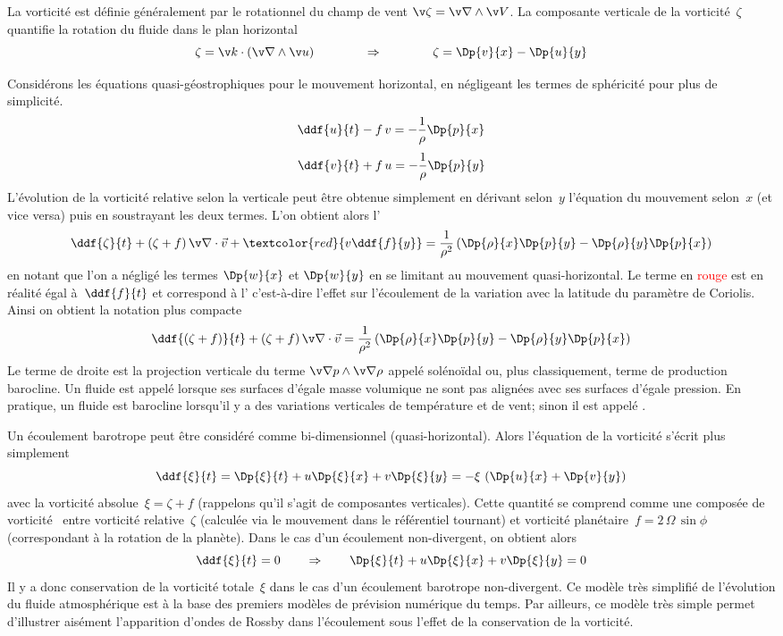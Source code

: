 \sk
La vorticité est définie généralement par le rotationnel du champ de vent
$\v \zeta = \v \nabla \wedge \v V$. La composante verticale de la vorticité~$\zeta$
quantifie la rotation du fluide dans le plan horizontal
\[ 
\zeta = \v k \cdot \left( \v \nabla \wedge \v u \right) 
\qquad\qquad \Rightarrow \qquad\qquad
\zeta = \Dp{v}{x} - \Dp{u}{y}
\]

\sk
Considérons les équations quasi-géostrophiques pour le mouvement horizontal,
en négligeant les termes de sphéricité pour plus de simplicité.
\[ \ddf{u}{t} - f\,v = -\frac{1}{\rho} \Dp{p}{x} \]
\[ \ddf{v}{t} + f\,u = -\frac{1}{\rho} \Dp{p}{y} \]
\noindent L'évolution 
de la vorticité relative 
selon la verticale
peut être obtenue simplement en
dérivant selon~$y$ l'équation du mouvement selon~$x$
(et vice versa) puis en soustrayant les deux termes.
L'on obtient alors l'
\[
\ddf{\zeta}{t} + (\zeta+f) \, \v \nabla \cdot \vec v + \textcolor{red}{v \ddf{f}{y}}
= \frac{1}{\rho^2} \left( \Dp{\rho}{x} \Dp{p}{y} - \Dp{\rho}{y} \Dp{p}{x} \right)
\]
\noindent en notant que l'on a négligé les termes
$\Dp{w}{x}$ et $\Dp{w}{y}$ en se limitant au mouvement quasi-horizontal.
Le terme en \textcolor{red}{rouge} est en réalité égal à~$\ddf{f}{t}$
et correspond à l' c'est-à-dire
l'effet sur l'écoulement de la variation avec la
latitude du paramètre de Coriolis.
Ainsi on obtient la notation plus compacte
\[
\ddf{(\zeta + f)}{t} + (\zeta+f) \, \v \nabla \cdot \vec v
= \frac{1}{\rho^2} \left( \Dp{\rho}{x} \Dp{p}{y} - \Dp{\rho}{y} \Dp{p}{x} \right)
\]
\noindent Le terme de droite est la projection verticale
du terme $\v \nabla p \wedge \v \nabla \rho$
appelé solénoïdal ou, plus classiquement, terme de production barocline.
Un fluide est appelé  lorsque
ses surfaces d'égale masse volumique
ne sont pas alignées avec ses surfaces d'égale pression.
En pratique, un fluide est barocline
lorsqu'il y a des variations verticales de température
et de vent; sinon il est appelé .


\sk
Un écoulement barotrope peut être considéré comme bi-dimensionnel (quasi-horizontal).
Alors l'équation de la vorticité s'écrit plus simplement
\[
\ddf{\xi}{t}
=
\Dp{\xi}{t} + u \Dp{\xi}{x} + v \Dp{\xi}{y}
=
- \xi \, \left( \Dp{u}{x} + \Dp{v}{y} \right)
\]
\noindent avec la vorticité absolue~$\xi = \zeta + f$
(rappelons qu'il s'agit de composantes verticales). 
Cette quantité se comprend comme une \og composée de vorticité \fg~entre
vorticité relative~$\zeta$ (calculée via le mouvement dans le référentiel tournant)
et vorticité planétaire~$f = 2\,\Omega\,\sin\phi$ (correspondant à la rotation de la planète).
Dans le cas d'un écoulement non-divergent, on obtient alors
\[
\ddf{\xi}{t} = 0
\qquad
\Rightarrow
\qquad
\Dp{\xi}{t} + u \Dp{\xi}{x} + v \Dp{\xi}{y}
=
0
\]
\noindent Il y a donc conservation de la vorticité totale~$\xi$
dans le cas d'un écoulement barotrope non-divergent.
Ce modèle très simplifié de l'évolution du fluide atmosphérique
est à la base des premiers modèles de prévision numérique du temps.
Par ailleurs, ce modèle très simple permet d'illustrer aisément
l'apparition d'ondes de Rossby dans l'écoulement 
sous l'effet de la conservation de la vorticité.


